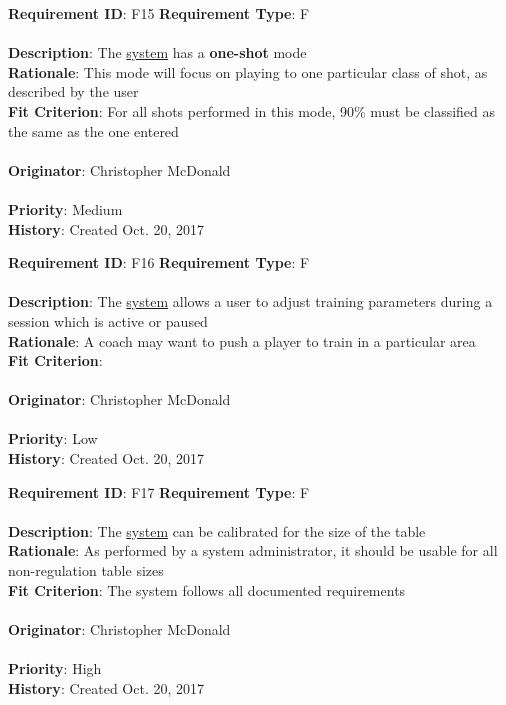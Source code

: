 \documentclass[11pt]{article}
\begin{document}
\begin{framed}
	\noindent\textbf{Requirement ID}: F15 \hfill \textbf{Requirement Type}: F \hfill\\\\
	\noindent\textbf{Description}: The \hyperref[sec:definitions]{system} has a \textbf{one-shot} mode \\
	\textbf{Rationale}: This mode will focus on playing to one particular class of shot, as described by the user \\
	\textbf{Fit Criterion}: For all shots performed in this mode, 90\% must be classified as the same as the one entered \\\\
	\textbf{Originator}: Christopher McDonald \\\\
	\textbf{Priority}: Medium \hfill \\
	\noindent\textbf{History}: Created Oct. 20, 2017
\end{framed}

\begin{framed}
	\noindent\textbf{Requirement ID}: F16 \hfill \textbf{Requirement Type}: F \hfill\\\\
	\noindent\textbf{Description}: The \hyperref[sec:definitions]{system} allows a user to adjust training parameters during a session which is active or paused \\
	\textbf{Rationale}: A coach may want to push a player to train in a particular area \\
	\textbf{Fit Criterion}:  \\\\
	\textbf{Originator}: Christopher McDonald \\\\
	\textbf{Priority}: Low \hfill \\
	\noindent\textbf{History}: Created Oct. 20, 2017
\end{framed}

\begin{framed}
	\noindent\textbf{Requirement ID}: F17 \hfill \textbf{Requirement Type}: F \hfill\\\\
	\noindent\textbf{Description}: The \hyperref[sec:definitions]{system} can be calibrated for the size of the table \\
	\textbf{Rationale}: As performed by a system administrator, it should be usable for all non-regulation table sizes \\
	\textbf{Fit Criterion}: The system follows all documented requirements \\\\
	\textbf{Originator}: Christopher McDonald \\\\
	\textbf{Priority}: High \hfill \\
	\noindent\textbf{History}: Created Oct. 20, 2017
\end{framed}
\end{document}
